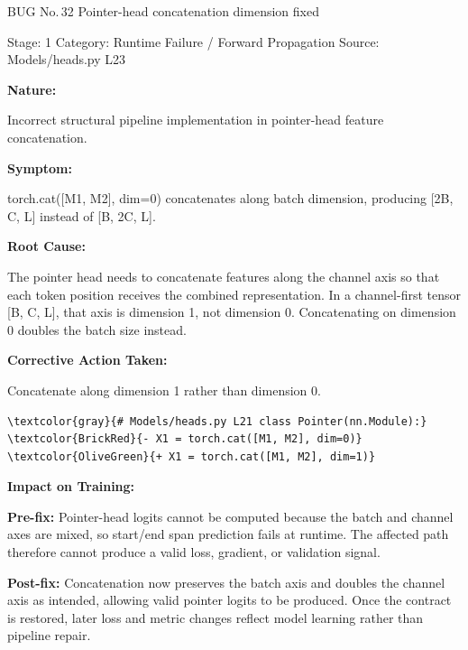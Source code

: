 \documentclass[10pt]{article}
\newcommand{\FieldLabel}[1]{%
 {\bfseries #1:}\par
}
\begin{document}
\begin{bugbox}{BUG No.\,32 \quad Pointer-head concatenation dimension fixed}
{\color{MetaGray}\small Stage: 1 \;\textbar\; Category: Runtime Failure / Forward Propagation \;\textbar\; Source: Models/heads.py L23\par}
\vspace{0.22em}
\FieldLabel{Nature}
Incorrect structural pipeline implementation in pointer-head feature concatenation.
\par
\vspace{0.35em}
\FieldLabel{Symptom}
torch.cat({[}M1, M2{]}, dim=0) concatenates along batch dimension, producing {[}2B, C, L{]} instead of {[}B, 2C, L{]}.
\par
\vspace{0.35em}
\FieldLabel{Root Cause}
The pointer head needs to concatenate features along the channel axis so that each token position receives the combined representation. In a channel-first tensor {[}B, C, L{]}, that axis is dimension 1, not dimension 0. Concatenating on dimension 0 doubles the batch size instead.
\par
\vspace{0.35em}
\FieldLabel{Corrective Action Taken}
Concatenate along dimension 1 rather than dimension 0.
\par
\vspace{0.35em}
\begin{Verbatim}[commandchars=\\\{\},fontsize=\footnotesize,breaklines=true,breaksymbol={},frame=leftline,framerule=2pt,rulecolor=\color{gray!40},xleftmargin=6pt,formatcom=\singlespacing]
\textcolor{gray}{# Models/heads.py L21 class Pointer(nn.Module):}
\textcolor{BrickRed}{- X1 = torch.cat([M1, M2], dim=0)}
\textcolor{OliveGreen}{+ X1 = torch.cat([M1, M2], dim=1)}
\end{Verbatim}
\vspace{0.22em}
\FieldLabel{Impact on Training}
\textbf{Pre-fix:} Pointer-head logits cannot be computed because the batch and channel axes are mixed, so start/end span prediction fails at runtime. The affected path therefore cannot produce a valid loss, gradient, or validation signal.\par\smallskip
\textbf{Post-fix:} Concatenation now preserves the batch axis and doubles the channel axis as intended, allowing valid pointer logits to be produced. Once the contract is restored, later loss and metric changes reflect model learning rather than pipeline repair.
\par
\vspace{0.35em}
\end{bugbox}
\end{document}
